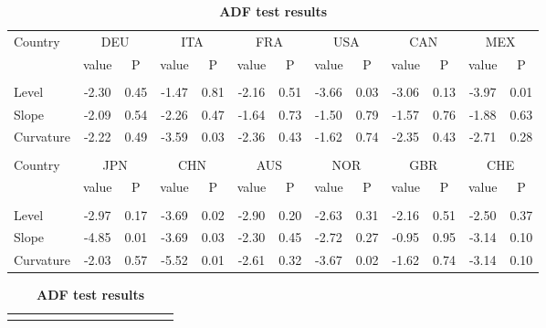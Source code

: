 \documentclass[12pt,bibliography=totoc]{article}
\begin{document}
\begin{appendices}
\begin{table}
\begin{subtable}[t]{1\textwidth}
\begin{tabular}{l cc cc cc cc cc cc}
Country	&	\multicolumn{2}{c}{DEU}			&	\multicolumn{2}{c}{ITA}			&	\multicolumn{2}{c}{FRA}			&	\multicolumn{2}{c}{USA}			&	\multicolumn{2}{c}{CAN}			&	\multicolumn{2}{c}{MEX}			\\[0.5ex] 

& value &P 		& value &P 			& value &P  		& value& P         			& value &P				& value &P\\

\hline       \\ [-1.5ex] 

Level	&	-2.30	&	0.45	&	-1.47	&	0.81	&	-2.16	&	0.51	&	-3.66	&	0.03	&	-3.06	&	0.13	&	-3.97	&	0.01	\\
Slope	&	-2.09	&	0.54	&	-2.26	&	0.47	&	-1.64	&	0.73	&	-1.50	&	0.79	&	-1.57	&	0.76	&	-1.88	&	0.63	\\
\medskip
Curvature	&	-2.22	&	0.49	&-3.59	&0.03	&	-2.36	&	0.43	&	-1.62	&	0.74	&	-2.35	&	0.43	&	-2.71	&	0.28	\\

\hline   \\ [-1.5ex]    

Country	&	\multicolumn{2}{c}{JPN}			&	\multicolumn{2}{c}{CHN}			&	\multicolumn{2}{c}{AUS}			&	\multicolumn{2}{c}{NOR}			&	\multicolumn{2}{c}{GBR}			&	\multicolumn{2}{c}{CHE}			\\

 & value &P & value &P& value &P & value &P& value &P & value &P\\

\hline       \\ [-1.5ex] 

Level	&	-2.97	&	0.17	&	-3.69	&	0.02	&	-2.90	&	0.20	&	-2.63	&	0.31	&	-2.16	&	0.51	&	-2.50	&	0.37	\\
Slope	&	-4.85	&	0.01	&	-3.69	&	0.03	&	-2.30	&	0.45	&	-2.72	&	0.27	&	-0.95	&	0.95	&	-3.14	&	0.10	\\
Curvature	&	-2.03	&0.57	&	-5.52	&	0.01	&	-2.61	&	0.32	&	-3.67	&	0.02	&	-1.62	&	0.74	&	-3.14	&	0.10	\\
\hline
\end{tabular}
\caption{\textbf{ADF test results}}
\end{subtable}
\hspace{\fill}
\bigskip 

\begin{subtable}[t]{1\textwidth}
\centering%
\begin{tabular}{l cc cc cc cc cc cc}%
\hline\hline \\ [-1.5ex]                         %


\end{tabular}
\end{subtable}
\end{table}
\end{appendices}
\end{document}
